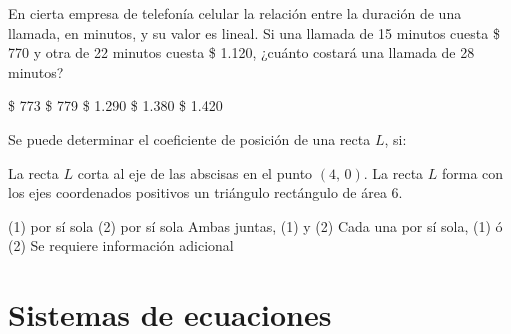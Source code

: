 \documentclass[sin nombre]{srs}
\begin{document}
\begin{preguntas}[after-item-skip=2cm]
\pregunta En cierta empresa de telefonía celular la relación entre la duración de una llamada, en minutos, y su valor es lineal. Si una llamada de 15 minutos cuesta \$ 770 y otra de 22 minutos cuesta \$ 1.120, ¿cuánto costará una llamada de 28 minutos?
\begin{vertical}
\alternativa \$ 773
\alternativa \$ 779
\alternativa \$ 1.290
\alternativa \$ 1.380
\alternativa \$ 1.420
\end{vertical}

\pregunta Se puede determinar el coeficiente de posición de una recta $L$, si:
\begin{verticaln}
\alternativa La recta $L$ corta al eje de las abscisas en el punto $\left(4,\,0\right)$.
\alternativa La recta $L$ forma con los ejes coordenados positivos un triángulo rectángulo de área 6.
\end{verticaln}
\begin{vertical}
\alternativa (1) por sí sola
\alternativa (2) por sí sola
\alternativa Ambas juntas, (1) y (2)
\alternativa Cada una por sí sola, (1) ó (2)
\alternativa Se requiere información adicional
\end{vertical}
\end{preguntas}

\section{Sistemas de ecuaciones}
\end{document}
